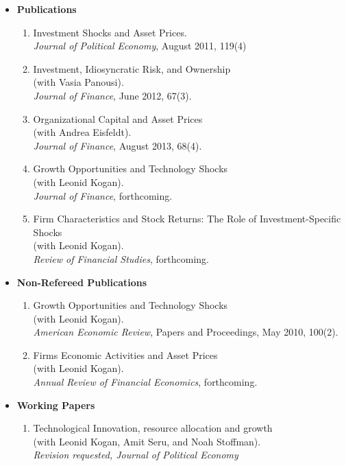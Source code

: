 \documentclass[11pt,a4paper,sans]{moderncv}
\begin{document}
\begin{resume}
\begin{itemize}
\item \textbf{Publications}
\begin{enumerate}
\item Investment Shocks and Asset Prices.\\
\emph{Journal of Political Economy},  August 2011, 119(4)
\item Investment, Idiosyncratic Risk, and Ownership\\ (with Vasia Panousi).\\
\emph{Journal of Finance}, June 2012, 67(3).
\item Organizational Capital and Asset Prices\\ (with Andrea Eisfeldt).\\
\emph{Journal of Finance}, August 2013, 68(4).
\item Growth Opportunities and Technology Shocks\\ (with Leonid Kogan).\\
\emph{Journal of Finance}, forthcoming.
\item Firm Characteristics and Stock Returns: The Role of Investment-Specific Shocks\\ (with Leonid Kogan).\\
\emph{Review of Financial Studies},  forthcoming.

\end{enumerate}

\vspace{0.5cm}
\item \textbf{Non-Refereed Publications}
\begin{enumerate}
\item Growth Opportunities and Technology Shocks\\ (with Leonid Kogan). \\
\emph{American Economic Review}, Papers and Proceedings, May 2010, 100(2).
\item Firms Economic Activities and Asset Prices\\ (with Leonid Kogan). \\
\emph{Annual Review of Financial Economics}, forthcoming.
\end{enumerate}

\vspace{0.5cm}
\item \textbf{Working Papers}
\begin{enumerate}

\item Technological Innovation, resource allocation and growth\\ (with Leonid Kogan, Amit Seru, and Noah Stoffman).\\
\emph{Revision requested, Journal of Political Economy}


\end{enumerate}
\end{itemize}
\end{resume}
\end{document}
